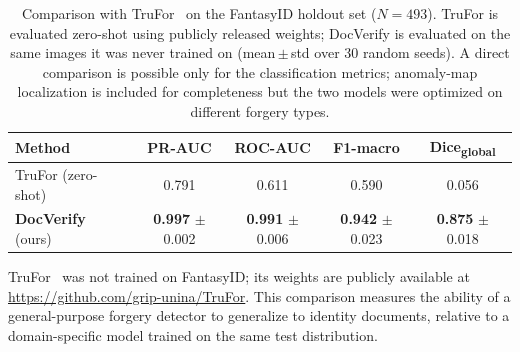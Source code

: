 \begin{table}[t]
\centering
\caption{Comparison with TruFor~\cite{trufor2023} on the FantasyID holdout set
($N=493$). TruFor is evaluated zero-shot using publicly released weights;
DocVerify is evaluated on the same images it was never trained on
(mean\,$\pm$\,std over 30 random seeds).
A direct comparison is possible only for the classification metrics;
anomaly-map localization is included for completeness but the two models
were optimized on different forgery types.}
\label{tab:sota_comparison}
\setlength{\tabcolsep}{5pt}
\begin{tabular}{lcccc}
\toprule
\textbf{Method} & \textbf{PR-AUC} & \textbf{ROC-AUC} & \textbf{F1-macro} & \textbf{Dice\textsubscript{global}} \\
\midrule
TruFor (zero-shot)~\cite{trufor2023} & 0.791 & 0.611 & 0.590 & 0.056 \\
\textbf{DocVerify} (ours) & \textbf{0.997} $\pm$ 0.002 & \textbf{0.991} $\pm$ 0.006 & \textbf{0.942} $\pm$ 0.023 & \textbf{0.875} $\pm$ 0.018 \\
\bottomrule
\end{tabular}
\begin{tablenotes}
\small
\item TruFor~\cite{trufor2023} was not trained on FantasyID; its weights are publicly
available at \url{https://github.com/grip-unina/TruFor}. This comparison measures
the ability of a general-purpose forgery detector to generalize to identity
documents, relative to a domain-specific model trained on the same test distribution.
\end{tablenotes}
\end{table}
